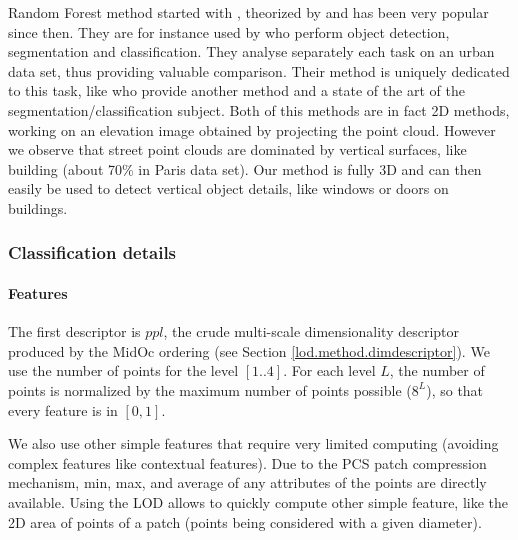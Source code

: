 		
		
		Random Forest method started with \cite{Amit97shapequantization}, theorized by \cite{Breiman2001} and has been very popular since then. They are for instance used by \cite{Golovinskiy2009} who perform object detection, segmentation and classification. They analyse separately each task on an urban data set, thus providing valuable comparison. Their method is uniquely dedicated to this task, like \cite{Serna2014} who provide another method and a state of the art of the segmentation/classification subject.
		Both of this methods are in fact 2D methods, working on an elevation image obtained by projecting the point cloud. However we observe that street point clouds are dominated by vertical surfaces, like building (about 70\% in Paris data set). Our method is fully 3D and can then easily be used to detect vertical object details, like windows or doors on buildings.
		
		
		\subsubsection{Classification details}  
		\paragraph{Features}
		The first descriptor is $ppl$, the crude multi-scale dimensionality descriptor produced by the MidOc ordering (see Section \ref{lod.method.dimdescriptor}).
		We use the number of points for the level $[1..4]$. For each level $L$, the number of points is normalized by the maximum number of points possible ($8^L$), so that every feature is in $[0,1]$.
		
		\label{lod.method.classification.other_feature}
		We also use other simple features that require very limited computing (avoiding complex features like contextual features). 
		Due to the PCS patch compression mechanism,
		min, max, and average of any attributes of the points are directly available.
		Using the LOD allows to quickly compute other simple feature, like the 2D area of points of a patch (points being considered with a given diameter). 
		
